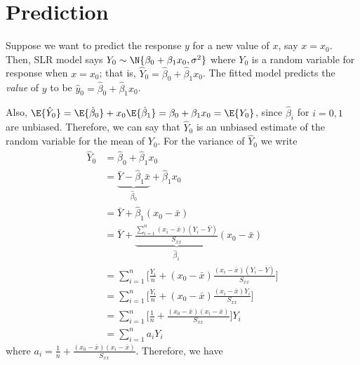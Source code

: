 \section{Prediction}
Suppose we want to predict the response $ y $
for a new value of $ x $, say $ x=x_0 $. Then,
SLR model says
$ Y_0 \sim \N{\beta_0+\beta_1 x_0,\sigma^2} $
where $ Y_0 $ is a random variable for response when $ x=x_0 $;
that is, $ \hat{Y}_0=\hat{\beta}_0+\hat{\beta}_1x_0 $.
The fitted model predicts the \emph{value} of $ y $
to be $ \hat{y}_0=\hat{\beta}_0+\hat{\beta}_1x_0 $.

Also, $\E{\hat{Y}_0}=\E{\hat{\beta}_0}+x_0\E{\hat{\beta}_1}=
  \beta_0+\beta_1x_0=\E{Y_0} $,
since $ \hat{\beta}_i $ for $ i=0,1 $ are unbiased.
Therefore, we can say that $ \hat{Y}_0 $ is an unbiased estimate
of the random variable for the mean of $ Y_0 $. For the variance
of $ \hat{Y}_0 $ we write
\begin{align*}
  \hat{Y}_0
   & =\hat{\beta}_0+\hat{\beta}_1x_0                                                                            \\
   & =\underbrace{\bar{Y}-\hat{\beta}_1\bar{x}}_{\hat{\beta}_0}+\hat{\beta}_1x_0                                \\
   & =\bar{Y}+\hat{\beta}_1(x_0-\bar{x})                                                                        \\
   & =\bar{Y}+\underbrace{\frac{\sum_{i=1}^{n}(x_i-\bar{x})(Y_i-\bar{Y})}{S_{xx}}}_{\hat{\beta}_1}(x_0-\bar{x}) \\
   & =\sum_{i=1}^{n} \biggl[ \frac{Y_i}{n} +(x_0-\bar{x})
  \frac{(x_i-\bar{x})(Y_i-\bar{Y})}{S_{xx}}  \biggr]                                                            \\
   & =\sum_{i=1}^{n} \biggl[ \frac{Y_i}{n} +(x_0-\bar{x})
  \frac{(x_i-\bar{x})Y_i}{S_{xx}} \biggr]                                                                       \\
   & =\sum_{i=1}^{n} \biggl[ \frac{1}{n} +\frac{(x_0-\bar{x})(x_i-\bar{x})}{S_{xx}} \biggr]
  Y_i                                                                                                           \\
   & =\sum_{i=1}^{n} a_i Y_i
\end{align*}
where $ \displaystyle  a_i=\frac{1}{n} +\frac{(x_0-\bar{x})(x_i-\bar{x})}{S_{xx}} $.
Therefore, we have
